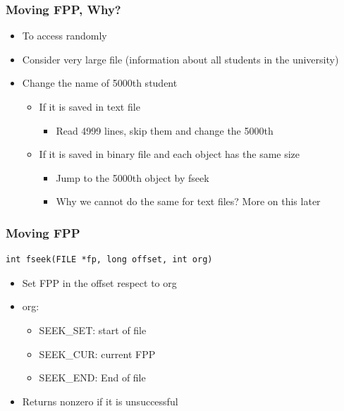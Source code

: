 \documentclass{../c-lecture}
\begin{document}
\begin{frame}
  \frametitle{Moving FPP, Why?}
  \begin{itemize}
    \item To access randomly
    \item
      Consider very large file (information about all students in the
      university)

    \item Change the name of 5000th student
    \begin{itemize}
      \item If it is saved in text file
      \begin{itemize}
        \item Read 4999 lines, skip them and change the 5000th
      \end{itemize}
      \item If it is saved in binary file and each object has the same size
      \begin{itemize}
        \item Jump to the 5000th object by fseek
        \item Why we cannot do the same for text files? More on this later
      \end{itemize}
    \end{itemize}
  \end{itemize}
\end{frame}

\begin{frame}[fragile]
  \frametitle{Moving FPP}
  \begin{verbatim}
int fseek(FILE *fp, long offset, int org)
  \end{verbatim}
  \begin{itemize}
    \item Set FPP in the offset respect to org
    \item org:
    \begin{itemize}
      \item SEEK_SET: start of file
      \item SEEK_CUR: current FPP
      \item SEEK_END: End of file
    \end{itemize}
    \item Returns nonzero if it is unsuccessful
  \end{itemize}
\end{frame}
\end{document}
